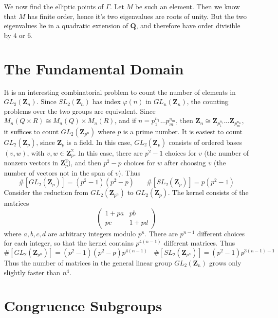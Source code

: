 We now find the elliptic points of $\Gamma$. Let $M$ be such an element. Then we know that $M$ has finite order, hence it's two eigenvalues are roots of unity. But the two eigenvalues lie in a quadratic extension of $\mathbf{Q}$, and therefore have order divisible by 4 or 6.

\section{The Fundamental Domain}

It is an interesting combinatorial problem to count the number of elements in $GL_2(\mathbf{Z}_n)$. Since $SL_2(\mathbf{Z}_n)$ has index $\varphi(n)$ in $GL_n(\mathbf{Z}_n)$, the counting problems over the two groups are equivalent. Since $M_n(Q \times R) \cong M_n(Q) \times M_n(R)$, and if $n = p_1^{n_1} \dots p_m^{n_m}$, then $\mathbf{Z}_n \cong \mathbf{Z}_{p_1^{n_1}} \dots \mathbf{Z}_{p_m^{n_m}}$, it suffices to count $GL_2(\mathbf{Z}_{p^n})$ where $p$ is a prime number. It is easiest to count $GL_2(\mathbf{Z}_p)$, since $\mathbf{Z}_p$ is a field. In this case, $GL_2(\mathbf{Z}_p)$ consists of ordered bases $(v,w)$, with $v,w \in \mathbf{Z}_p^2$. In this case, there are $p^2 - 1$ choices for $v$ (the number of nonzero vectors in $\mathbf{Z}_p^2$), and then $p^2 - p$ choices for $w$ after choosing $v$ (the number of vectors not in the span of $v$). Thus
%
\[ \#[GL_2(\mathbf{Z}_p)] = (p^2 - 1)(p^2 - p)\ \ \ \ \ \ \ \ \#[SL_2(\mathbf{Z}_p)] = p (p^2 - 1) \]
%
Consider the reduction from $GL_2(\mathbf{Z}_{p^n})$ to $GL_2(\mathbf{Z}_p)$. The kernel consists of the matrices
%
\[ \begin{pmatrix} 1 + pa & pb \\ pc & 1 + pd \end{pmatrix} \]
%
where $a,b,c,d$ are arbitrary integers modulo $p^n$. There are $p^{n-1}$ different choices for each integer, so that the kernel contains $p^{4(n-1)}$ different matrices. Thus
%
\[ \#[GL_2(\mathbf{Z}_{p^n})] = (p^2 - 1)(p^2 - p) p^{4(n-1)}\ \ \ \ \#[SL_2(\mathbf{Z}_{p^n})] = (p^2 - 1)p^{3(n-1) + 1} \]
%
Thus the number of matrices in the general linear group $GL_2(\mathbf{Z}_n)$ grows only slightly faster than $n^4$.

\section{Congruence Subgroups}

